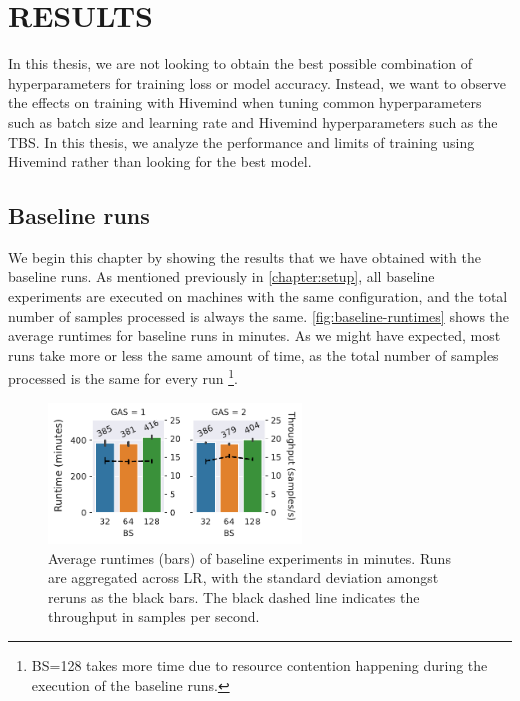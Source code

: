 \chapter{RESULTS}\label{chapter:results}

In this thesis, we are not looking to obtain the best possible combination of hyperparameters for training loss or model accuracy.
Instead, we want to observe the effects on training with Hivemind when tuning common hyperparameters such as batch size and learning rate and Hivemind hyperparameters such as the TBS.
In this thesis, we analyze the performance and limits of training using Hivemind rather than looking for the best model.

\section{Baseline runs}

We begin this chapter by showing the results that we have obtained with the baseline runs.
As mentioned previously in \autoref{chapter:setup}, all baseline experiments are executed on machines with the same configuration, and the total number of samples processed is always the same.
\autoref{fig:baseline-runtimes} shows the average runtimes for baseline runs in minutes.
As we might have expected, most runs take more or less the same amount of time, as the total number of samples processed is the same for every run
\footnote{
    BS=128 takes more time due to resource contention happening during the execution of the baseline runs.
}.

\begin{figure}[ht]
    \centering
    \includegraphics[width=0.6\textwidth]{./figures/06_barplot-runtime_baseline-16vCPUs-GAS-1.pdf}
    \caption{
        Average runtimes (bars) of baseline experiments in minutes.
        Runs are aggregated across LR, with the standard deviation amongst reruns as the black bars.
        The black dashed line indicates the throughput in samples per second.
    }
    \label{fig:baseline-runtimes}
\end{figure}

